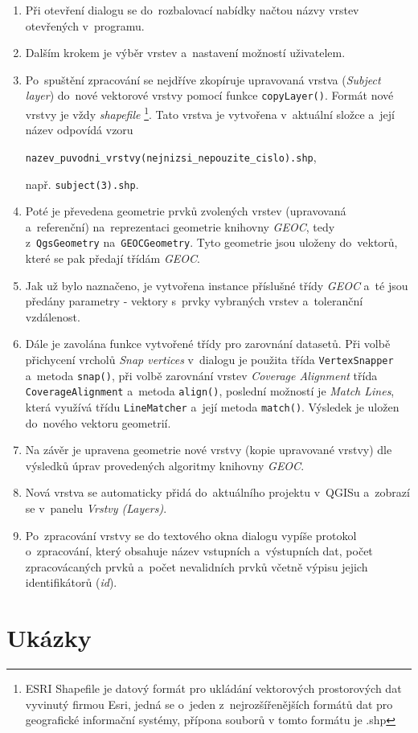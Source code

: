 \begin{enumerate}
 \item Při otevření dialogu se do~rozbalovací nabídky načtou názvy vrstev 
	otevřených v~programu.
 \item Dalším krokem je výběr vrstev a~nastavení možností uživatelem.
 \item Po~spuštění zpracování se nejdříve zkopíruje upravovaná vrstva 
	(\textit{Subject layer}) do~nové vektorové vrstvy pomocí funkce 
	\texttt{copyLayer()}. Formát nové vrstvy je vždy \textit{shapefile}
	\footnote{ESRI Shapefile je datový formát pro ukládání vektorových 
	  prostorových dat  vyvinutý firmou Esri, jedná se o~jeden 
	  z~nejrozšířenějších formátů dat pro geografické informační systémy,
	  přípona souborů v tomto formátu je .shp}.
	Tato vrstva je vytvořena v~aktuální složce a~její název odpovídá vzoru 
	\begin{center}
	 \texttt{nazev\_puvodni\_vrstvy(nejnizsi\_nepouzite\_cislo).shp},
	\end{center}
	např. \texttt{subject(3).shp}.
 \item Poté je převedena geometrie prvků zvolených vrstev (upravovaná
	a~referenční) na~reprezentaci geometrie knihovny \textit{GEOC},
	tedy z~\texttt{Qgs\-Geo\-metry} na~\texttt{GEOC\-Geo\-metry}. 
	Tyto geometrie 	jsou uloženy do~vektorů, které se pak předají 
	třídám \textit{GEOC}.
 \item Jak už bylo naznačeno, je vytvořena instance příslušné třídy 
	\textit{GEOC} a~té jsou předány parametry - vektory s~prvky vybraných
	vrstev a~toleranční vzdálenost. 
 \item Dále je zavolána funkce vytvořené třídy pro zarovnání datasetů. Při volbě 
	při\-chycení vrcholů \textit{Snap vertices} v~dialogu je použita třída 
	\texttt{Vertex\-Snapper} a~metoda \texttt{snap()}, při volbě zarovnání 
	vrstev \textit{Coverage Alignment} třída \texttt{Cove\-rage\-Align\-ment} 
	a~metoda \texttt{align()}, poslední možností je \textit{Match Lines}, která
	využívá třídu \texttt{Line\-Matcher} a~její metoda \texttt{match()}. 
	Výsledek je uložen do~nového vektoru geometrií.
 \item Na závěr je upravena geometrie nové vrstvy (kopie upravované vrstvy) dle
	výsledků úprav provedených algoritmy knihovny \textit{GEOC}.
 \item Nová vrstva se automaticky přidá do~aktuálního projektu v~QGISu a~zobrazí
	se v~panelu \textit{Vrstvy (Layers)}.
 \item Po~zpracování vrstvy se do textového okna dialogu vypíše protokol 
	o~zpracování, který obsahuje název vstupních a~výstupních dat, počet
	zpracovácaných prvků a~počet nevalidních prvků včetně výpisu jejich
	identifikátorů (\textit{id}).
\end{enumerate}


\section{Ukázky}
\label{plugin-ukazky}





 


